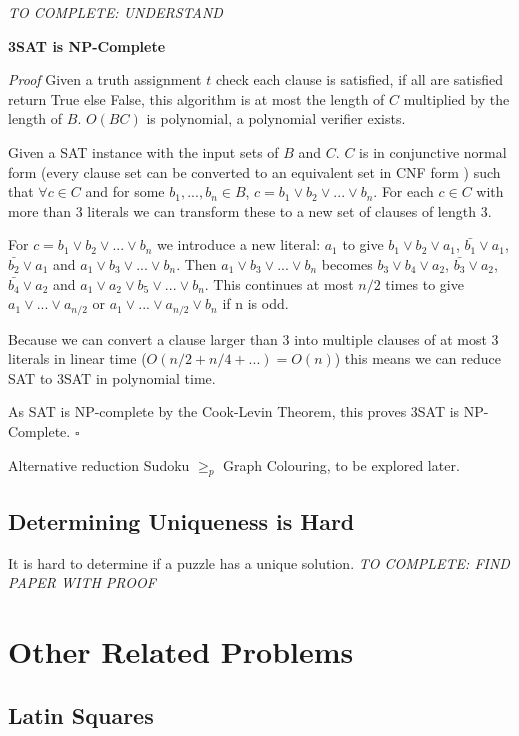 \documentclass[a4paper,12pt]{article}
\begin{document}
 \textit{TO COMPLETE: UNDERSTAND \cite{tripartite to sat}}

\textbf{3SAT is NP-Complete}

\textit{Proof}
Given a truth assignment $t$ check each clause is satisfied, if all are satisfied return True else False, this algorithm is at most the length of $C$ multiplied by the length of $B$. $O(BC)$ is polynomial, a polynomial verifier exists. 

Given a SAT instance with the input sets of $B$ and $C$. $C$ is in conjunctive normal form (every clause set can be converted to an equivalent set in CNF form \cite{CNF}) such that $\forall c \in C$ and for some $b_1, ... ,b_n \in B$, $c = b_1 \lor b_2 \lor ... \lor b_n$. For each $c \in C$ with more than 3 literals we can transform these to a new set of clauses of length 3. 

For $c = b_1 \lor b_2 \lor ... \lor b_n$ we introduce a new literal: $a_1$ to give $b_1 \lor b_2 \lor a_1$, $\bar{b_1} \lor a_1$, $\bar{b_2} \lor a_1$ and $a_1 \lor b_3 \lor ... \lor b_n$. Then $a_1 \lor b_3 \lor ... \lor b_n$ becomes $b_3 \lor b_4 \lor a_2$, $\bar{b_3} \lor a_2$, $\bar{b_4} \lor a_2$ and $a_1 \lor a_2 \lor b_5 \lor ... \lor b_n$. This continues at most $n/2$ times to give $a_1 \lor ... \lor a_{n/2}$ or $a_1 \lor ... \lor a_{n/2} \lor b_n$ if n is odd. 

Because we can convert a clause larger than 3 into multiple clauses of at most 3 literals in linear time ($O(n/2 + n/4 + ...) = O(n)$) this means we can reduce SAT to 3SAT in polynomial time. 

As SAT is NP-complete by the Cook-Levin Theorem, this proves 3SAT is NP-Complete. $\square$
		
Alternative reduction Sudoku $\geq_p$  Graph Colouring, to be explored later.

	\subsection{Determining Uniqueness is Hard}

It is hard to determine if a puzzle has a unique solution. 	 \textit{TO COMPLETE: FIND PAPER WITH PROOF}
		
\section{Other Related Problems}
	\subsection{Latin Squares}
\end{document}
